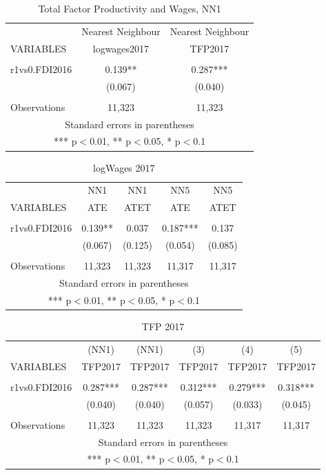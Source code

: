 \documentclass[a4paper,11pt]{scrartcl}
\begin{document}
\begin{table}[htbp]\centering
\caption{Total Factor Productivity and Wages, NN1}
\begin{tabular}{lcc} \hline
 & Nearest Neighbour & Nearest Neighbour \\
VARIABLES & logwages2017 & TFP2017 \\ \hline
 &  &  \\
r1vs0.FDI2016 & 0.139** & 0.287*** \\
 & (0.067) & (0.040) \\
 &  &  \\
 Observations & 11,323 & 11,323 \\ \hline
\multicolumn{3}{c}{ Standard errors in parentheses} \\
\multicolumn{3}{c}{ *** p$<$0.01, ** p$<$0.05, * p$<$0.1} \\
\end{tabular}
\end{table}


\begin{table}[htbp]\centering
\caption{logWages 2017}
\begin{tabular}{lcccc} \hline
 & NN1 & NN1 & NN5 & NN5 \\
VARIABLES & ATE & ATET & ATE & ATET\\ \hline
 &  &  &  &  \\
r1vs0.FDI2016 & 0.139** & 0.037 & 0.187*** & 0.137 \\
 & (0.067) & (0.125) & (0.054) & (0.085) \\
 &  &  &  &  \\
 Observations & 11,323 & 11,323 & 11,317 & 11,317 \\ \hline
\multicolumn{5}{c}{ Standard errors in parentheses} \\
\multicolumn{5}{c}{ *** p$<$0.01, ** p$<$0.05, * p$<$0.1} \\
\end{tabular}
\end{table}

\begin{table}[htbp]\centering
\caption{TFP 2017}
\begin{tabular}{lccccc} \hline
 & (NN1) & (NN1) & (3) & (4) & (5) \\
VARIABLES & TFP2017 & TFP2017 & TFP2017 & TFP2017 & TFP2017 \\ \hline
 &  &  &  &  &  \\
r1vs0.FDI2016 & 0.287*** & 0.287*** & 0.312*** & 0.279*** & 0.318*** \\
 & (0.040) & (0.040) & (0.057) & (0.033) & (0.045) \\
 &  &  &  &  &  \\
 Observations & 11,323 & 11,323 & 11,323 & 11,317 & 11,317 \\ \hline
\multicolumn{6}{c}{ Standard errors in parentheses} \\
\multicolumn{6}{c}{ *** p$<$0.01, ** p$<$0.05, * p$<$0.1} \\
\end{tabular}
\end{table}
\end{document}
